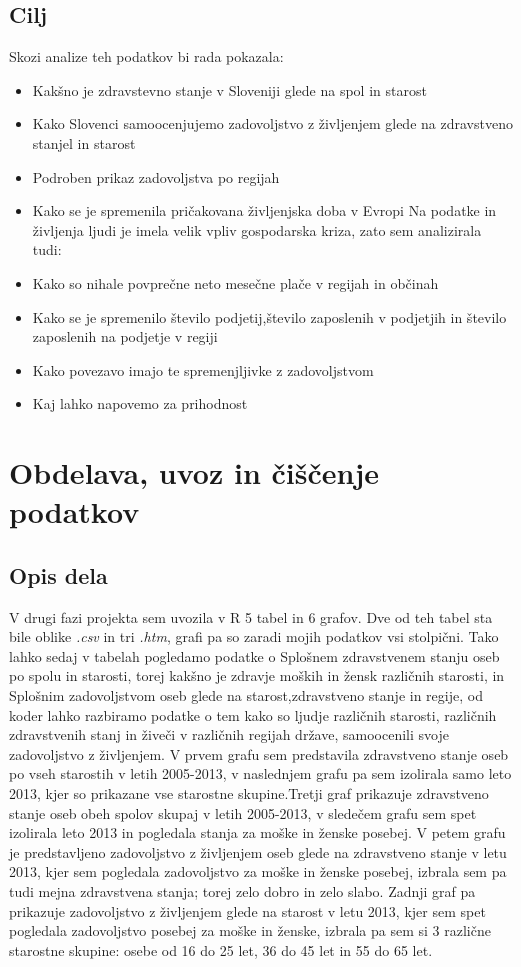 \documentclass[11pt,a4paper]{article}
\begin{document}
\subsection{Cilj}
Skozi analize teh podatkov bi rada pokazala:
\begin{itemize}
\item Kakšno je zdravstevno stanje v Sloveniji glede na spol in starost
\item Kako Slovenci samoocenjujemo zadovoljstvo z življenjem glede na zdravstveno stanjel in starost 
\item Podroben prikaz zadovoljstva po regijah
\item Kako se je spremenila pričakovana življenjska doba v Evropi
Na podatke in življenja ljudi je imela velik vpliv gospodarska kriza, zato sem analizirala tudi:
\item Kako so nihale povprečne neto mesečne plače v regijah in občinah
\item Kako se je spremenilo število podjetij,število  zaposlenih v podjetjih in število zaposlenih na podjetje v regiji
\item Kako povezavo imajo te spremenjljivke z zadovoljstvom
\item Kaj lahko napovemo za prihodnost
\end{itemize}
\section{Obdelava, uvoz in čiščenje podatkov}
\subsection{Opis dela}
V drugi fazi projekta sem uvozila v R 5 tabel in 6 grafov. Dve od teh tabel sta bile oblike \textit{.csv} in tri \textit{.htm}, grafi pa so zaradi mojih podatkov vsi stolpični. Tako lahko sedaj v tabelah pogledamo podatke o Splošnem zdravstvenem stanju oseb po spolu in starosti, torej kakšno je zdravje moških in žensk različnih starosti, in Splošnim zadovoljstvom oseb glede na starost,zdravstveno stanje in regije, od koder lahko razbiramo podatke o tem kako so ljudje različnih starosti, različnih zdravstvenih stanj in živeči v različnih regijah države, samoocenili svoje zadovoljstvo z življenjem. V prvem grafu sem predstavila zdravstveno stanje oseb po vseh starostih v letih 2005-2013, v naslednjem grafu pa sem izolirala samo leto 2013, kjer so prikazane vse starostne skupine.Tretji graf prikazuje zdravstveno stanje oseb obeh spolov skupaj v letih 2005-2013, v sledečem grafu sem spet izolirala leto 2013 in pogledala stanja za moške in ženske posebej. V petem grafu je predstavljeno zadovoljstvo z življenjem oseb glede na zdravstveno stanje v letu 2013, kjer sem pogledala zadovoljstvo za moške in ženske posebej, izbrala sem pa tudi mejna zdravstvena stanja; torej zelo dobro in zelo slabo. Zadnji graf pa prikazuje zadovoljstvo z življenjem glede na starost v letu 2013, kjer sem spet pogledala zadovoljstvo posebej za moške in ženske, izbrala pa sem si 3 različne starostne skupine: osebe od 16 do 25 let, 36 do 45 let in 55 do 65 let.
\end{document}
